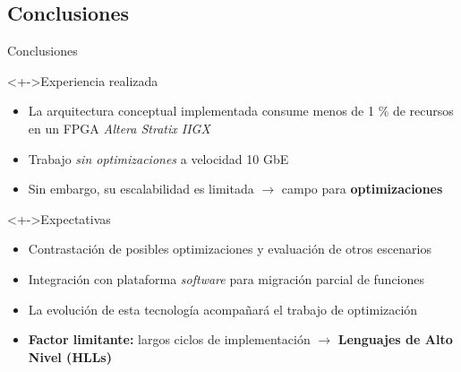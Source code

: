 \documentclass[xcolor=dvipsnames]{beamer}
\begin{document}
\subsection{Conclusiones}
\begin{frame}{Conclusiones}

  \begin{block}<+->{Experiencia realizada}
    \begin{itemize}
      \item La arquitectura conceptual implementada consume menos de 1 \% de recursos en un FPGA \emph{Altera Stratix IIGX}
      \item Trabajo \emph{sin optimizaciones} a velocidad 10 GbE 
      \item Sin embargo, su escalabilidad es limitada $\rightarrow$ campo para {\bf optimizaciones}	
    \end{itemize}
  \end{block}
    
  \begin{block}<+->{Expectativas}
    \begin{itemize}
      \item Contrastación de posibles optimizaciones y evaluación de otros escenarios
      \item Integración con plataforma \emph{software} para migración parcial de funciones 
      \item La evolución de esta tecnología acompañará el trabajo de optimización
      \item {\bf Factor limitante:} largos ciclos de implementación $\rightarrow$ {\bf Lenguajes de Alto Nivel (HLLs)}
    \end{itemize}
  \end{block}
\end{frame}

\end{document}
